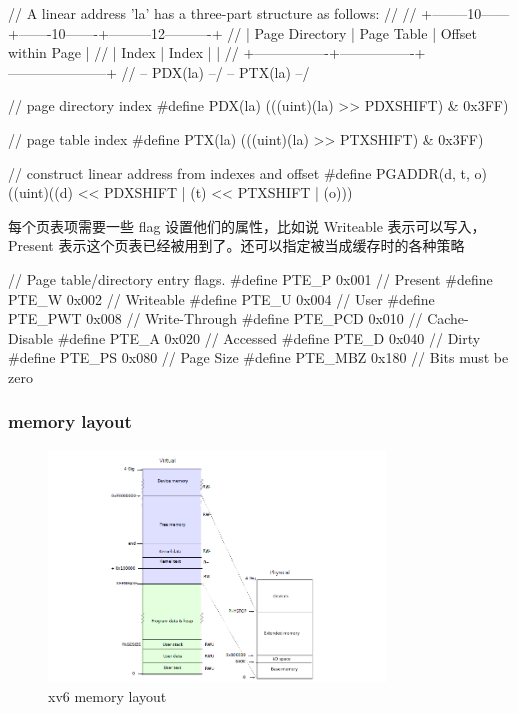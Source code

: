 
\begin{ccode}
    // A linear address 'la' has a three-part structure as follows:
    //
    // +--------10------+-------10-------+---------12----------+
    // | Page Directory |   Page Table   | Offset within Page  |
    // |      Index     |      Index     |                     |
    // +----------------+----------------+---------------------+
    //  \--- PDX(la) --/ \--- PTX(la) --/
        
    // page directory index
    #define PDX(la)      (((uint)(la) >> PDXSHIFT) & 0x3FF)
        
    // page table index
    #define PTX(la)      (((uint)(la) >> PTXSHIFT) & 0x3FF)
        
    // construct linear address from indexes and offset
    #define PGADDR(d, t, o)   ((uint)((d) << PDXSHIFT | (t) << PTXSHIFT | (o)))
\end{ccode}

每个页表项需要一些 flag 设置他们的属性，比如说 Writeable 表示可以写入，Present 表示这个页表已经被用到了。还可以指定被当成缓存时的各种策略


\begin{ccode}
    // Page table/directory entry flags.
    #define PTE_P      0x001   // Present
    #define PTE_W      0x002   // Writeable
    #define PTE_U      0x004   // User
    #define PTE_PWT    0x008   // Write-Through
    #define PTE_PCD    0x010   // Cache-Disable
    #define PTE_A      0x020   // Accessed
    #define PTE_D      0x040   // Dirty
    #define PTE_PS     0x080   // Page Size
    #define PTE_MBZ    0x180   // Bits must be zero
\end{ccode}

\subsubsection{memory layout}
 
\begin{figure}[h]
    \centering
    \includegraphics[width=0.8\textwidth]{img/memlayout.PNG}
    \caption{xv6 memory layout}
    \label{fig:2}
\end{figure}

